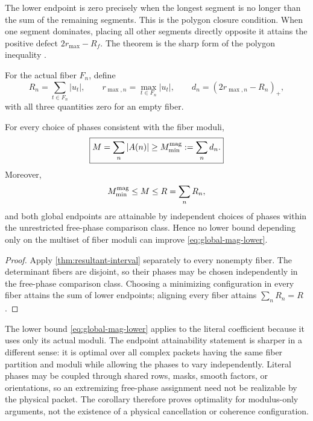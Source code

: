 \begin{remark}
The lower endpoint is zero precisely when the longest segment is no
longer than the sum of the remaining segments.  This is the polygon
closure condition.  When one segment dominates, placing all other
segments directly opposite it attains the positive defect
\(2r_{\max}-R_f\).  The theorem is the sharp form of the polygon
inequality \citep{HardyLittlewoodPolya1952}.
\end{remark}

For the actual fiber \(F_n\), define
\begin{equation}
 R_n=\sum_{t\in F_n}|u_t|,\qquad
 r_{\max,n}=\max_{t\in F_n}|u_t|,
\qquad
 d_n=(2r_{\max,n}-R_n)_+,
\label{eq:fiber-defect}
\end{equation}
with all three quantities zero for an empty fiber.

\begin{corollary}
\label{cor:sharp-global-envelope}
For every choice of phases consistent with the fiber moduli,
\begin{equation}
 \boxed{
 M=\sum_n|A(n)|
 \ge M_{\min}^{\rm mag}:=\sum_n d_n.}
\label{eq:global-mag-lower}
\end{equation}
Moreover,
\begin{equation}
 M_{\min}^{\rm mag}
 \le M\le R=\sum_nR_n,
\label{eq:global-envelope}
\end{equation}
and both global endpoints are attainable by independent choices of
phases within the unrestricted free-phase comparison class.  Hence no
lower bound depending only on the multiset of fiber moduli can improve
\eqref{eq:global-mag-lower}.
\end{corollary}

\begin{proof}
Apply \cref{thm:resultant-interval} separately to every nonempty
fiber.  The determinant fibers are disjoint, so their phases may be
chosen independently in the free-phase comparison class.  Choosing a
minimizing configuration in every fiber attains the sum of lower
endpoints; aligning every fiber attains \(\sum_nR_n=R\).
\end{proof}

\begin{remark}
\label{rem:free-phase-sharpness}
The lower bound \eqref{eq:global-mag-lower} applies to the literal
coefficient because it uses only its actual moduli.  The endpoint
attainability statement is sharper in a different sense: it is
optimal over all complex packets having the same fiber partition and
moduli while allowing the phases to vary independently.  Literal
phases may be coupled through shared rows, masks, smooth factors, or
orientations, so an extremizing free-phase assignment need not be
realizable by the physical packet.  The corollary therefore proves
optimality for modulus-only arguments, not the existence of a
physical cancellation or coherence configuration.
\end{remark}

